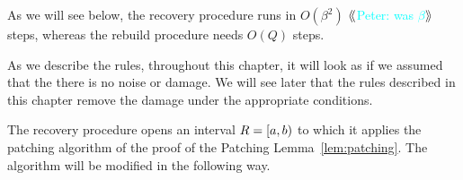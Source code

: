 \documentclass[12pt]{memoir}
\newcommand{\authnote}[3]
{{ \textcolor{#3}{$\langle\hspace{-0.2em}\langle$\textsf{\footnotesize #1: #2}$\rangle\hspace{-0.2em}\rangle$}}}
\newcommand{\authnote}[2]{}
\newcommand{\Pnote}[1]{{\authnote{Peter}{#1}{cyan}}}
\newcommand{\fld}[1]{\ensuremath{\textit{#1}}}
\newcommand{\rul}[1]{\ensuremath{\texttt{\slshape #1\/}}}
\def\B{B}
\newcommand{\E}{E}
\newcommand{\R}{R}
\newcommand{\Addr}{\fld{Addr}}
\newcommand{\Core}{\fld{Core}}
\newcommand{\Rec}{\fld{Rec}}
\newcommand{\cRec}{\fld{cRec}}
\newcommand{\Sweep}{\fld{Sw}}
\newcommand{\Alarm}{\rul{Alarm}}
\begin{document}
As we will see below, the recovery procedure runs in \( O(\beta^{2}) \) \Pnote{was \( \beta \)}
steps, whereas the rebuild procedure needs \( O(Q) \) steps.

As we describe the rules,
throughout this chapter, it will look as if we assumed that the there is no noise or damage.
We will see later that the rules described in this chapter remove the damage under the 
appropriate conditions.

The recovery procedure opens an interval \( \R = \lint{a}{b} \) to which it applies the
patching algorithm of the proof of the Patching Lemma~\ref{lem:patching}.
The algorithm will be modified in the following way.


















\end{document}
